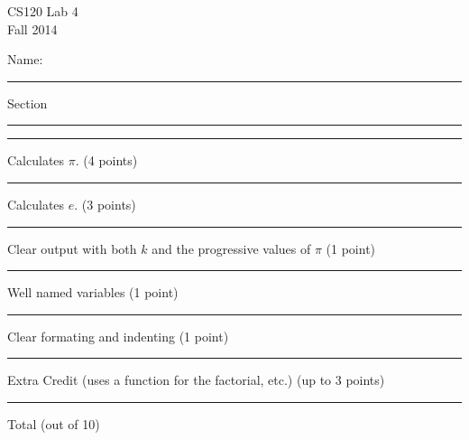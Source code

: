 \documentclass[12pt,openbib]{article}
\begin{document}
\thispagestyle{empty}
\vspace{-1.0in}
\large
\begin{center}
\textsf{CS120  Lab 4}\\
\textsf{Fall 2014}
\end{center}
\vspace{-0.2in}
\large\textsf{Name: }\rule[-0.01in]{2.5in}{0.015in}
\hspace{0.5in} Section \rule[-0.01in]{1.0in}{0.015in}

\normalsize
\rm
\vspace{0.5in}

 
\rule[-0.01in]{0.5in}{0.015in} Calculates $\pi$. (4 points)

\rule[-0.01in]{0.5in}{0.015in} Calculates $e$. (3 points)

\rule[-0.01in]{0.5in}{0.015in} Clear output with both $k$ and the progressive values of $\pi$ (1 point)

\rule[-0.01in]{0.5in}{0.015in} Well named variables (1 point)

\rule[-0.01in]{0.5in}{0.015in} Clear formating and indenting (1 point)

\rule[-0.01in]{0.5in}{0.015in} Extra Credit (uses a function for the factorial, etc.) (up to 3 points)

\rule[-0.01in]{0.5in}{0.015in} Total (out of 10)
\end{document}
